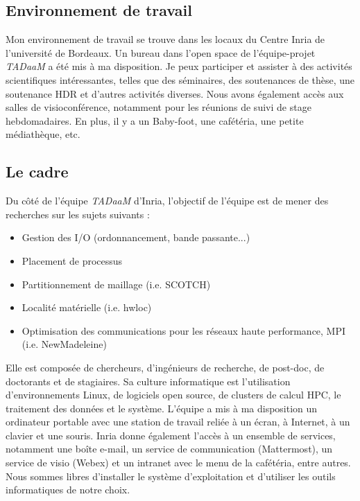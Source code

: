 
\subsection{Environnement de travail}

Mon environnement de travail se trouve dans les locaux du Centre Inria de l'université de Bordeaux.
Un bureau dans l'open space de l'équipe-projet \emph{TADaaM} a été mis à ma disposition.
Je peux participer et assister à des activités scientifiques intéressantes, telles que des séminaires, des soutenances de thèse, une soutenance HDR et d'autres activités diverses.
Nous avons également accès aux salles de visioconférence, notamment pour les réunions de suivi de stage hebdomadaires.
En plus, il y a un Baby-foot, une cafétéria, une petite médiathèque, etc.

\subsection{Le cadre}

Du côté de l'équipe \emph{TADaaM} d'Inria, l'objectif de l'équipe est de mener des recherches sur les sujets suivants :

\begin{itemize}
  \item Gestion des I/O (ordonnancement, bande passante...)
  \item Placement de processus
  \item Partitionnement de maillage (i.e. SCOTCH)
  \item Localité matérielle (i.e. hwloc)
  \item Optimisation des communications pour les réseaux haute performance, MPI (i.e. NewMadeleine)
\end{itemize}

Elle est composée de chercheurs, d'ingénieurs de recherche, de post-doc, de doctorants et de stagiaires.
Sa culture informatique est l'utilisation d'environnements Linux, de logiciels open source, de clusters de calcul HPC,
le traitement des données et le système.
L'équipe a mis à ma disposition un ordinateur portable avec une station de travail reliée à un écran, à Internet, à un clavier et une souris.
Inria donne également l'accès à un ensemble de services, notamment une boîte e-mail, un service de communication (Mattermost), un service de visio (Webex) et un intranet avec le menu de la cafétéria, entre autres.
Nous sommes libres d'installer le système d'exploitation et d'utiliser les outils informatiques de notre choix.

